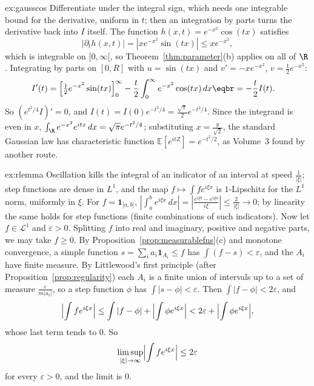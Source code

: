 \begin{solution}{ex:gausscos}
\idea Differentiate under the integral sign, which needs one integrable bound for the derivative, uniform in $t$; then an integration by parts turns the
derivative back into $I$ itself.
\writeup The function $h(x,t)=e^{-x^2}\cos(tx)$ satisfies \[|\partial_th(x,t)|=|xe^{-x^2}\sin(tx)|\le xe^{-x^2},\] which is integrable on $[0,\infty[$, so Theorem~\ref{thm:parameter}(b) applies on all of $\R$. Integrating by parts on $[0,R]$
with $u=\sin(tx)$ and $v'=-xe^{-x^2}$, $v=\frac12e^{-x^2}$:
\[\begin{aligned}I'(t)&=\Bigl[\tfrac12e^{-x^2}\sin(tx)\Bigr]_0^\infty-\frac t2\int_0^\infty e^{-x^2}\cos(tx)\,dx\eqbr=-\frac t2I(t).\end{aligned}\]
So $(e^{t^2/4}I)'=0$, and $I(t)=I(0)e^{-t^2/4}=\frac{\sqrt\pi}2e^{-t^2/4}$. Since the integrand is even in $x$, $\int_\R e^{-x^2}e^{itx}\,dx=\sqrt\pi e^{-t^2/4}$; substituting $x=\frac y{\sqrt2}$, the standard
Gaussian law has characteristic function $\mathbb E[e^{itZ}]=e^{-t^2/2}$, as Volume~3 found by another route.
\end{solution}

\begin{solution}{ex:rlemma}
\idea Oscillation kills the integral of an indicator of an interval at speed $\frac1{|\xi|}$; step functions are dense in $L^1$, and the map $f\mapsto\int fe^{i\xi x}$ is $1$-Lipschitz for the $L^1$
norm, uniformly in $\xi$.
\writeup For $f=\mathbf 1_{]a,b]}$, $|\int_a^be^{i\xi x}\,dx|=|\frac{e^{i\xi b}-e^{i\xi a}}{i\xi}|\le\frac2{|\xi|}\to0$; by linearity the same holds for step functions (finite combinations of such indicators).
Now let $f\in\mathcal L^1$ and $\varepsilon>0$. Splitting $f$ into real and imaginary, positive and negative parts, we may take $f\ge0$. By Proposition~\ref{prop:measurablefns}(c) and monotone
convergence, a simple function $s=\sum_ia_i\mathbf 1_{A_i}\le f$ has $\int(f-s)<\varepsilon$, and the $A_i$ have finite measure. By Littlewood's first principle (after Proposition~\ref{prop:regularity}) each $A_i$
is a finite union of intervals up to a set of measure $\frac\varepsilon{m|a_i|}$, so a step function $\phi$ has $\int|s-\phi|<\varepsilon$. Then $\int|f-\phi|<2\varepsilon$, and
\[\Bigl|\int fe^{i\xi x}\Bigr|\le\int|f-\phi|+\Bigl|\int\phi e^{i\xi x}\Bigr|<2\varepsilon+\Bigl|\int\phi e^{i\xi x}\Bigr|,\]
whose last term tends to $0$. So \[\limsup_{|\xi|\to\infty}\Bigl|\int fe^{i\xi x}\Bigr|\le2\varepsilon\] for every $\varepsilon>0$, and the limit is $0$.
\end{solution}

